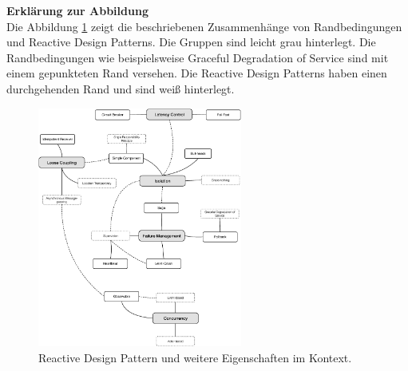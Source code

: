 \begin{framed}
\textbf{Erklärung zur Abbildung}\\
Die Abbildung \ref{fig:patterns-context} zeigt die beschriebenen Zusammenhänge von Randbedingungen und Reactive Design Patterns. Die Gruppen sind leicht grau hinterlegt. Die Randbedingungen wie beispielsweise Graceful Degradation of Service sind mit einem gepunkteten Rand versehen. Die Reactive Design Patterns haben einen durchgehenden Rand und sind weiß hinterlegt.
\end{framed}
  
\begin{figure}[H]
 \centering
 \includegraphics[width=0.6\textwidth]{4-Hauptteil/context/context.eps}
 \caption{Reactive Design Pattern und weitere Eigenschaften im Kontext.}
 \label{fig:patterns-context}
\end{figure}